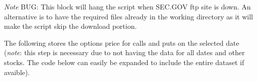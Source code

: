 \documentclass[english,man]{apa6}
\newenvironment{Shaded}{\begin{snugshade}}{\end{snugshade}}
\newcommand{\KeywordTok}[1]{\textcolor[rgb]{0.13,0.29,0.53}{\textbf{{#1}}}}
\newcommand{\DecValTok}[1]{\textcolor[rgb]{0.00,0.00,0.81}{{#1}}}
\newcommand{\StringTok}[1]{\textcolor[rgb]{0.31,0.60,0.02}{{#1}}}
\newcommand{\NormalTok}[1]{{#1}}
\begin{document}
\begin{Shaded}
\end{Shaded}

\emph{Note} BUG: This block will hang the script when SEC.GOV ftp site
is down. An alternative is to have the required files already in the
working directory as it will make the script skip the download portion.

The following stores the options price for calls and puts on the
selected date (\emph{note}: this step is necessary due to not having the
data for all dates and other stocks. The code below can easily be
expanded to include the entire dataset if avaible).
\end{document}

